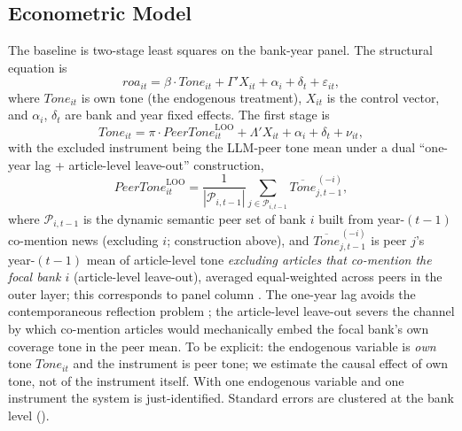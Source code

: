 \subsection{Econometric Model}
The baseline is two-stage least squares on the bank-year panel. The structural equation is
\begin{equation}\label{eq:second}
\mathit{roa}_{it} = \beta \cdot \mathit{Tone}_{it}
 + \Gamma' X_{it} + \alpha_i + \delta_t + \varepsilon_{it},
\end{equation}
where $\mathit{Tone}_{it}$ is own tone  (the endogenous
treatment), $X_{it}$ is the control vector, and $\alpha_i$, $\delta_t$ are bank and year fixed
effects. The first stage is
\begin{equation}\label{eq:first}
\mathit{Tone}_{it} = \pi \cdot \mathit{PeerTone}^{\mathrm{LOO}}_{it}
 + \Lambda' X_{it} + \alpha_i + \delta_t + \nu_{it},
\end{equation}
with the excluded instrument being the LLM-peer tone mean under a dual ``one-year lag +
article-level leave-out'' construction,
\begin{equation}\label{eq:loo}
\mathit{PeerTone}^{\mathrm{LOO}}_{it}
 = \frac{1}{|\mathcal{P}_{i,t-1}|} \sum_{j \in \mathcal{P}_{i,t-1}}
 \overline{\mathit{Tone}}^{\,(-i)}_{j,t-1},
\end{equation}
where $\mathcal{P}_{i,t-1}$ is the dynamic semantic peer set of bank $i$ built from
year-$(t-1)$ co-mention news (excluding $i$; construction above), and
$\overline{\mathit{Tone}}^{\,(-i)}_{j,t-1}$ is peer $j$'s year-$(t-1)$ mean of article-level
tone \emph{excluding articles that co-mention the focal bank $i$} (article-level leave-out),
averaged equal-weighted across peers in the outer layer; this corresponds to panel column
. The one-year lag avoids the contemporaneous reflection
problem \parencite{manski1993reflection}; the article-level leave-out severs the channel by
which co-mention articles would mechanically embed the focal bank's own coverage tone in the
peer mean. To be explicit: the endogenous
variable is \emph{own} tone $\mathit{Tone}_{it}$ and the instrument is peer tone; we estimate
the causal effect of own tone, not of the instrument itself. With one endogenous variable and
one instrument the system is just-identified. Standard errors are clustered at the bank level
().

